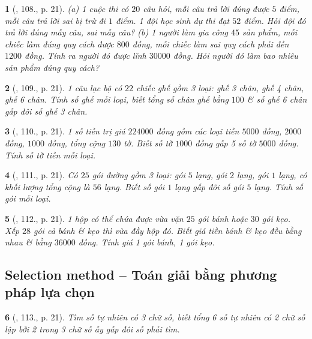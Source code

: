 \documentclass{article}
\newtheorem{baitoan}{}
\begin{document}
\begin{baitoan}[\cite{Binh_Toan_6_tap_1}, 108., p. 21]
	(a) 1 cuộc thi có $20$ câu hỏi, mỗi câu trả lời đúng được $5$ điểm, mỗi câu trả lời sai bị trừ đi $1$ điểm. 1 đội học sinh dự thi đạt $52$ điểm. Hỏi đội đó trả lời đúng mấy câu, sai mấy câu? (b) 1 người làm gia công $45$ sản phẩm, mỗi chiếc làm đúng quy cách được $800$ đồng, mỗi chiếc làm sai quy cách phải đền $1200$ đồng. Tính ra người đó được lĩnh $30000$ đồng. Hỏi người đó làm bao nhiêu sản phẩm đúng quy cách?
\end{baitoan}

\begin{baitoan}[\cite{Binh_Toan_6_tap_1}, 109., p. 21]
	1 câu lạc bộ có $22$ chiếc ghế gồm 3 loại: ghế 3 chân, ghế 4 chân, ghế 6 chân. Tính số ghế mỗi loại, biết tổng số chân ghế bằng $100$ \& số ghế 6 chân gấp đôi số ghế 3 chân.
\end{baitoan}

\begin{baitoan}[\cite{Binh_Toan_6_tap_1}, 110., p. 21]
	1 số tiền trị giá $224000$ đồng gồm các loại tiền $5000$ đồng, $2000$ đồng, $1000$ đồng, tổng cộng $130$ tờ. Biết số tờ $1000$ đồng gấp 5 số tờ $5000$ đồng. Tính số tờ tiền mỗi loại.
\end{baitoan}

\begin{baitoan}[\cite{Binh_Toan_6_tap_1}, 111., p. 21]
	Có $25$ gói đường gồm 3 loại: gói $5$ lạng, gói $2$ lạng, gói $1$ lạng, có khối lượng tổng cộng là $56$ lạng. Biết số gói $1$ lạng gấp đôi số gói $5$ lạng. Tính số gói mỗi loại.
\end{baitoan}

\begin{baitoan}[\cite{Binh_Toan_6_tap_1}, 112., p. 21]
	1 hộp có thể chứa được vừa vặn $25$ gói bánh hoặc $30$ gói kẹo. Xếp $28$ gói cả bánh \& kẹo thì vừa đầy hộp đó. Biết giá tiền bánh \& kẹo đều bằng nhau \& bằng $36000$ đồng. Tính giá 1 gói bánh, 1 gói kẹo.
\end{baitoan}

\subsection{Selection method -- Toán giải bằng phương pháp lựa chọn}

\begin{baitoan}[\cite{Binh_Toan_6_tap_1}, 113., p. 21]
	Tìm số tự nhiên có 3 chữ số, biết tổng 6 số tự nhiên có 2 chữ số lập bởi 2 trong 3 chữ số ấy gấp đôi số phải tìm.
\end{baitoan}
\end{document}
